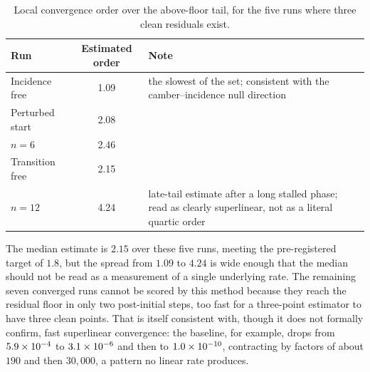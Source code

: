 \begin{table}[htbp]
\centering
\caption{Local convergence order over the above-floor tail, for the five runs
where three clean residuals exist.}
\label{tab:h3}
\begin{tabularx}{\textwidth}{@{}L c L@{}}
\toprule
Run & Estimated order & Note \\
\midrule
Incidence free & 1.09 & the slowest of the set; consistent with the camber--incidence null direction \\
Perturbed start & 2.08 & \\
$n=6$ & 2.46 & \\
Transition free & 2.15 & \\
$n=12$ & 4.24 & late-tail estimate after a long stalled phase; read as clearly superlinear, not as a literal quartic order \\
\bottomrule
\end{tabularx}
\end{table}

The median estimate is $2.15$ over these five runs, meeting the pre-registered
target of $1.8$, but the spread from $1.09$ to $4.24$ is wide enough that the
median should not be read as a measurement of a single underlying rate. The
remaining seven converged runs cannot be scored by this method because they
reach the residual floor in only two post-initial steps, too fast for a
three-point estimator to have three clean points. That is itself consistent
with, though it does not formally confirm, fast superlinear convergence: the
baseline, for example, drops from $5.9\times10^{-4}$ to $3.1\times10^{-6}$ and then to
$1.0\times10^{-10}$, contracting by factors of about $190$ and then $30{,}000$, a
pattern no linear rate produces.

